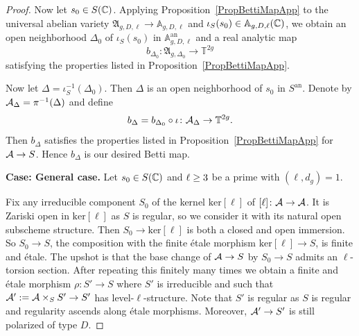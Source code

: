\begin{proof}
Now let $s_0 \in S({\mathbb{C}})$. Applying Proposition~\ref{PropBettiMapApp}
to the universal abelian variety
$\mathfrak{A}_{g,D,\ell} \rightarrow \mathbb A_{g,D,\ell}$ and
$\iota_S(s_0) \in \mathbb A_{g,D,\ell}({\mathbb{C}})$, we obtain an 
open neighborhood $\Delta_0$ of $\iota_S(s_0)$ in $\mathbb
A_{g,D,\ell}^{\mathrm{an}}$ and a real analytic map
\[
b_{\Delta_0} \colon \mathfrak{A}_{g,\Delta_0} \rightarrow \mathbb T^{2g}
\]
satisfying the properties listed in Proposition~\ref{PropBettiMapApp}.

Now let $\Delta = \iota_S^{-1}(\Delta_0)$. Then $\Delta$ is an open neighborhood of $s_0$ in $S^{\mathrm{an}}$. Denote by $\mathcal{A}_{\Delta} = \pi^{-1}(\Delta)$ and define
\[
b_{\Delta} = b_{\Delta_0} \circ \iota \colon \mathcal{A}_{\Delta} \rightarrow \mathbb T^{2g}.
\]
Then $b_{\Delta}$ satisfies the properties listed in Proposition~\ref{PropBettiMapApp} for $\mathcal{A} \rightarrow S$. Hence $b_{\Delta}$ is our desired Betti map.


\medskip
  \textbf{Case: General case.}
Let $s_0 \in S({\mathbb{C}})$ and $\ell\ge3$ be a prime with $(\ell,d_g)=1$.

Fix any irreducible component $S_0$ of the kernel $\mathrm{ker}[\ell]$ of $[\ell] \colon
\mathcal{A}\rightarrow \mathcal{A}$. It is Zariski open in $\mathrm{ker}[\ell]$ as $S$ is
regular, so we consider it with its natural open subscheme structure.
Then $S_0\rightarrow \mathrm{ker}[\ell]$ is both a closed and open
immersion. So $S_0\rightarrow S$, the composition with
the finite \'etale morphism $\mathrm{ker}[\ell]\rightarrow S$, is finite and \'etale.
The upshot is that the base change of $\mathcal{A}\rightarrow S$ by $S_0\rightarrow S$
admits an $\ell$-torsion section. After repeating this finitely many
times we obtain a finite and \'etale morphism $\rho \colon S'
\rightarrow S$ where $S'$ is irreducible and such that $\mathcal{A}':=
\mathcal{A}\times_S S' \rightarrow S'$ has level-$\ell$-structure.
Note that $S'$ is regular as $S$ is regular and regularity ascends
along \'etale morphisms. Moreover,
 $\mathcal{A}' \rightarrow S'$ is still polarized of type $D$.



\end{proof}

